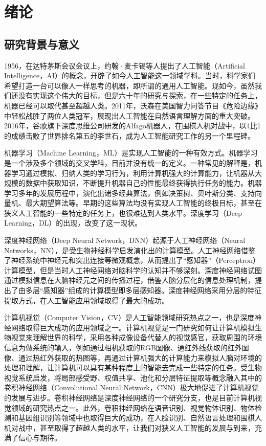 \chapter{绪论}
\label{cha:introduction}

\section{研究背景与意义}
\label{sec:intro}

1956，在达特茅斯会议会议上，约翰·麦卡锡等人提出了人工智能（Artificial Intelligence，AI）的概念，开辟了如今人工智能这一领域学科。当时，科学家们希望打造一台可以像人一样思考的机器，即所谓的通用人工智能。现如今，虽然我们还没有实现这个伟大的目标，但是六十年的研究与探索，在一些特定的任务上，机器已经可以取代甚至超越人类。2011年，沃森在美国智力问答节目《危险边缘》中轻松战胜了两位人类冠军，展现出人工智能在自然语言理解方面的重大突破。2016年，谷歌旗下深度思维公司研发的Alfago机器人，在围棋人机对战中，以4比1的成绩击败了世界排名第五的李世石，成为人工智能研究工作的另一个里程碑。

机器学习（Machine Learning，ML）是实现人工智能的一种有效方式。机器学习是一个涉及多个领域的交叉学科，目前并没有统一的定义。一种常见的解释是，机器学习通过模拟、归纳人类的学习行为，利用计算机强大的计算能力，让机器从大规模的数据中获取知识，不断提升机器自己的性能最终获得执行任务的能力。机器学习多年的发展历程中，演化出诸多经典算法，例如决策树、贝叶斯分类、支持向量机、最大期望算法等。早期的这些算法均没有实现人工智能的终极目标，甚至在狭义人工智能的一些特定的任务上，也很难达到人类水平。深度学习（Deep Learning，DL）的出现，改变了这一现状。

深度神经网络（Deep Neural Network，DNN）起源于人工神经网络（Neural Networks，NN），是受生物神经科学启发演化出的计算模型。人工神经网络借鉴了神经系统中神经元和突出连接等微观概念，从而提出了“感知器”（Perceptron）计算模型，但是当时人工神经网络对脑科学的认知并不够深刻。深度神经网络试图通过模拟信息在大脑神经元之间的传播过程，借鉴人脑分层化的信息处理机制，提出了由多层“感知器”组成的计算模型即多层感知器。深度神经网络采用分层的特征提取方式，在人工智能应用领域取得了最大的成功。

计算机视觉（Computer Vision，CV）是人工智能领域研究热点之一，也是深度神经网络取得巨大成功的应用领域之一。计算机视觉是一门研究如何让计算机模拟生物视觉来理解世界的科学，采用各种成像设备代替人的视觉感官，获取周围的环境信息为做系统的输入，例如通过相机获取的RGB图像、通红外线获取的红外图像、通过热红外获取的热图等，再通过计算机强大的计算能力来模拟人脑对环境的处理和理解，让计算机可以具有某种程度上的智能去完成一些特定的任务。受生物视觉系统启发，将局部感受野、权值共享、池化和分层特征提取等概念融入其中的卷积神经网络（Convolutional Neural Network，CNN）极大地促进了计算机视觉的发展与进步。卷积神经网络是深度神经网络的一个研究分支，也是目前计算机视觉领域的研究热点之一。此外，卷积神经网络在语音识别、视觉物体识别、物体检测和基因组识别等领域中也取得巨大的成功，在人脸识别、自然语言处理和围棋人机对战中，甚至取得了超越人类的水平，让我们对狭义人工智能的发展与到来，充满了信心与期待。

